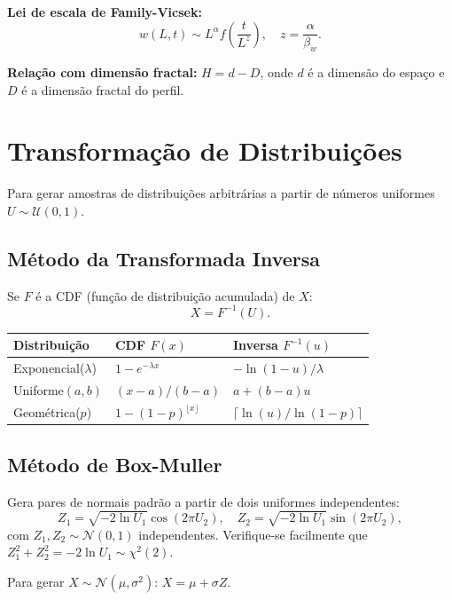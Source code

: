 \documentclass[12pt,a4paper]{article}
\begin{document}
\textbf{Lei de escala de Family-Vicsek:}
\[
  w(L,t) \sim L^\alpha f\!\left(\frac{t}{L^z}\right), \quad z = \frac{\alpha}{\beta_w}.
\]

\textbf{Rela\c{c}\~ao com dimens\~ao fractal:} $H = d - D$, onde $d$ \'e a dimens\~ao do espa\c{c}o e $D$ \'e a dimens\~ao fractal do perfil.

\section{Transforma\c{c}\~ao de Distribui\c{c}\~oes}

Para gerar amostras de distribui\c{c}\~oes arbitr\'arias a partir de n\'umeros uniformes $U \sim \mathcal{U}(0,1)$.

\subsection{M\'etodo da Transformada Inversa}

Se $F$ \'e a CDF (fun\c{c}\~ao de distribui\c{c}\~ao acumulada) de $X$:
\[
  X = F^{-1}(U).
\]

\begin{center}
\begin{tabular}{lll}
\toprule
Distribui\c{c}\~ao & CDF $F(x)$ & Inversa $F^{-1}(u)$ \\
\midrule
Exponencial($\lambda$) & $1 - e^{-\lambda x}$ & $-\ln(1-u)/\lambda$ \\
Uniforme$(a,b)$ & $(x-a)/(b-a)$ & $a + (b-a)u$ \\
Geom\'etrica($p$) & $1-(1-p)^{\lfloor x\rfloor}$ & $\lceil \ln(u)/\ln(1-p) \rceil$ \\
\bottomrule
\end{tabular}
\end{center}

\subsection{M\'etodo de Box-Muller}

Gera pares de normais padr\~ao a partir de dois uniformes independentes:
\[
  Z_1 = \sqrt{-2\ln U_1}\cos(2\pi U_2), \quad Z_2 = \sqrt{-2\ln U_1}\sin(2\pi U_2),
\]
com $Z_1, Z_2 \sim \mathcal{N}(0,1)$ independentes. Verifique-se facilmente que $Z_1^2 + Z_2^2 = -2\ln U_1 \sim \chi^2(2)$.

Para gerar $X \sim \mathcal{N}(\mu, \sigma^2)$: $X = \mu + \sigma Z$.
\end{document}
